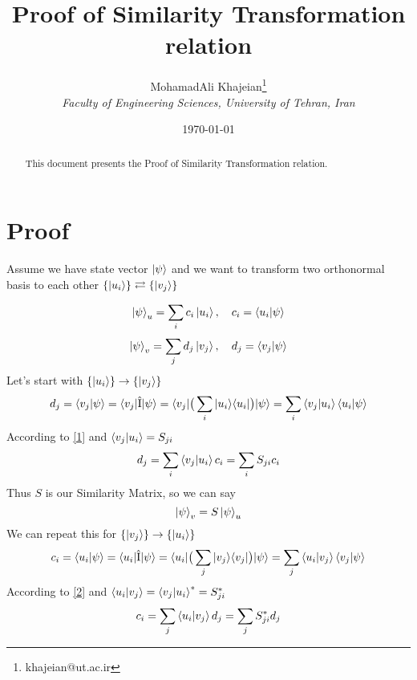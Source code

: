 \documentclass[12pt]{article}
\title{\textbf{Proof of Similarity Transformation relation}}
\author{
    MohamadAli Khajeian\footnote{khajeian@ut.ac.ir} \\ 
    \small \textit{Faculty of Engineering Sciences, University of Tehran, Iran} \\ 
}
\date{\today}
\begin{document}
\maketitle

\begin{abstract}
    This document presents the Proof of Similarity Transformation relation.
\end{abstract}

\section*{Proof}

Assume we have state vector $\ket{\psi}$ and we want to transform two orthonormal basis to each other $\{\ket{u_{i}}\} \rightleftarrows \{\ket{v_{j}}\}$

\begin{equation}
    \label{1}
    \ket{\psi}_{u} = \sum_{i} c_{i}\ket{u_{i}}, \quad c_{i} = \braket{u_{i}|\psi}
\end{equation}
\begin{equation}
    \label{2}
    \ket{\psi}_{v} = \sum_{j} d_{j}\ket{v_{j}}, \quad d_{j} = \braket{v_{j}|\psi}
\end{equation}
Let's start with $\{\ket{u_{i}}\} \rightarrow \{\ket{v_{j}}\}$
\begin{equation*}
    d_{j} = \braket{v_{j}|\psi} = \braket{v_{j}| \hat{\textnormal{I}} | \psi} = \braket{v_{j}| \big( \sum_{i} |u_{i}\rangle \langle u_{i}|\big) | \psi}
    = \sum_{i} \braket{v_{j}|u_{i}}\braket{u_{i}|\psi}
\end{equation*}
According to \ref{1} and $\braket{v_{j}|u_{i}} = S_{ji}$ 
\begin{equation}
    d_{j} = \sum_{i} \braket{v_{j}|u_{i}}c_{i} = \sum_{i} S_{ji}c_{i}
\end{equation}
Thus $S$ is our Similarity Matrix, so we can say
\begin{equation}
    \ket{\psi}_{v} = S\ket{\psi}_{u}
\end{equation}
We can repeat this for $\{\ket{v_{j}}\} \rightarrow \{\ket{u_{i}}\}$
\begin{equation*}
    c_{i} = \braket{u_{i}|\psi} = \braket{u_{i}| \hat{\textnormal{I}} | \psi} = \braket{u_{i}| \big( \sum_{j} |v_{j}\rangle \langle v_{j}|\big) | \psi}
    = \sum_{j} \braket{u_{i}|v_{j}}\braket{v_{j}|\psi}
\end{equation*}
According to \ref{2} and $\braket{u_{i}|v_{j}} = \braket{v_{j}|u_{i}}^{*} = S_{ji}^{*}$ 
\begin{equation}
    c_{i} = \sum_{j} \braket{u_{i}|v_{j}}d_{j} = \sum_{j} S_{ji}^{*}d_{j}
\end{equation}
\end{document}

